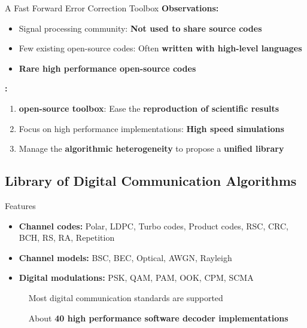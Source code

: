 \begin{frame}{A Fast Forward Error Correction Toolbox}
  \vfill
  \textbf{Observations:}

  \vspace{0.1cm}
  \begin{itemize}
    \item Signal processing community: \textbf{Not used to share source codes}
    \item Few existing open-source codes: Often \textbf{written with high-level languages}
    \item \textbf{Rare high performance open-source codes}
  \end{itemize}

  \vfill
  \pause
  \textbf{\AFFECT:}

  \vspace{0.1cm}
  \begin{enumerate}
    \item \Cxx \textbf{open-source toolbox}: Ease the \textbf{reproduction of scientific results}
    \pause
    \item Focus on high performance implementations: \textbf{High speed simulations}
    \pause
    \item Manage the \textbf{algorithmic heterogeneity} to propose a \textbf{unified library}
  \end{enumerate}
  \vfill
\end{frame}

\subsection[Library of Digital Communication Algorithms]{Library of Digital Communication Algorithms}

\begin{frame}{Features}
  \vfill
  \begin{itemize}
    \item \textbf{Channel codes:} Polar, LDPC, Turbo codes, Product codes, RSC, CRC, BCH, RS, RA, Repetition
    \vspace{0.1cm}
    \item \textbf{Channel models:} BSC, BEC, Optical, AWGN, Rayleigh
    \vspace{0.1cm}
    \item \textbf{Digital modulations:} PSK, QAM, PAM, OOK, CPM, SCMA
  \end{itemize}
  \vfill
  \pause

  \vspace*{.5em}
  ~~~~~{\color{bleuUni}\Large\MVRightarrow} Most digital communication standards are supported

  \vspace*{.5em}
  ~~~~~{\color{bleuUni}\Large\MVRightarrow} About \textbf{40 high performance software decoder implementations}
  \vfill
\end{frame}

